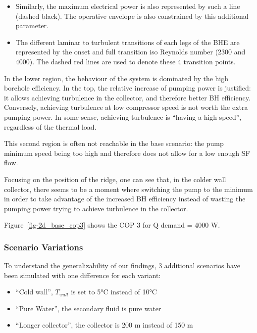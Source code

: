 \documentclass[journal=iecr,manuscript=]{achemso}
\providecommand{\tightlist}{%
  \setlength{\itemsep}{0pt}\setlength{\parskip}{0pt}}
\begin{document}
\begin{itemize}
\tightlist
\item
  Similarly, the maximum electrical power is also represented by such a
  line (dashed black). The operative envelope is also constrained by
  this additional parameter.
\end{itemize}

\begin{itemize}
\tightlist
\item
  The different laminar to turbulent transitions of each legs of the BHE
  are represented by the onset and full transition iso Reynolds number
  (2300 and 4000). The dashed red lines are used to denote these 4
  transition points.
\end{itemize}

In the lower region, the behaviour of the system is dominated by the
high borehole efficiency. In the top, the relative increase of pumping
power is justified: it allows achieving turbulence in the collector, and
therefore better BH efficiency. Conversely, achieving turbulence at low
compressor speed is not worth the extra pumping power. In some sense,
achieving turbulence is ``having a high speed'', regardless of the
thermal load.

This second region is often not reachable in the base scenario: the pump
minimum speed being too high and therefore does not allow for a low
enough SF flow.

Focusing on the position of the ridge, one can see that, in the colder
wall collector, there seems to be a moment where switching the pump to
the minimum in order to take advantage of the increased BH efficiency
instead of wasting the pumping power trying to achieve turbulence in the
collector.

Figure~\ref{fig-2d_base_cop3} shows the COP 3 for Q demand = 4000 W.

\subsubsection{Scenario Variations}\label{scenario-variations}

To understand the generalizability of our findings, 3 additional
scenarios have been simulated with one difference for each variant:

\begin{itemize}
\item
  ``Cold wall'', \(T_{wall}\) is set to 5°C instead of 10°C
\item
  ``Pure Water'', the secondary fluid is pure water
\item
  ``Longer collector'', the collector is 200 m instead of 150 m
\end{itemize}
\end{document}
